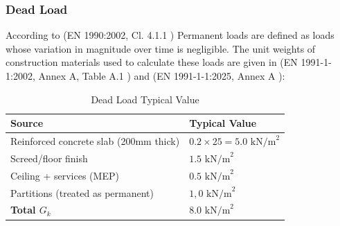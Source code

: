 \subsubsection{Dead Load}
According to  (EN 1990:2002, Cl. 4.1.1 \cite{EN1990-2002(5)}) Permanent loads are defined as loads whose variation in magnitude over time is negligible.
The unit weights of construction materials used to calculate these loads are given in (EN 1991-1-1:2002, Annex A, Table A.1 \cite{EN1991-1-1-2002(3)}) and (EN 1991-1-1:2025, Annex A \cite{EN1991-1-1-2025(2)}):
\begin{table}[H]
\centering
\caption{Dead Load Typical Value}
\begin{tabular}{LL}
\toprule
\textbf{Source}                        & \textbf{Typical Value} \\
\midrule
Reinforced concrete slab (200mm thick) & \( 0.2 \times  25 = 5.0 \text{ kN/m}^2   \)                      \\
Screed/floor finish                    & \( 1.5 \text{ kN/m}^2   \)                        \\
Ceiling + services (MEP)               &  \( 0.5 \text{ kN/m}^2   \)                      \\
Partitions (treated as permanent)      &   \( 1,0 \text{ kN/m}^2   \)                     \\
\textbf{Total \(G_k\)}                    &  \(8.0 \text{ kN/m}^2   \)\\\bottomrule
\end{tabular}
\end{table}




